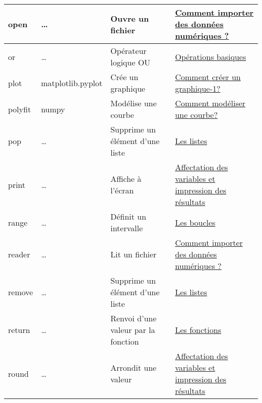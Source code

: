 \begin{longtable}{@{\extracolsep{\fill}}|p{} | p{} |p{} | p{}|@{}}
open
 & 
\ldots{}
 & 
Ouvre un fichier
 & 
\href{https://pyspc.readthedocs.io/fr/latest/05-bases/09-fichiers-csv.html}{Comment
importer des données numériques ?}
\\ \hline

or
 & 
\ldots{}
 & 
Opérateur logique OU
 & 
\href{https://pyspc.readthedocs.io/fr/latest/05-bases/04-operations_basiques.html}{Opérations
basiques}
\\ \hline

plot
 & 
matplotlib.pyplot
 & 
Crée un graphique
 & 
\href{https://pyspc.readthedocs.io/fr/latest/05-bases/10-graphiques_partie_1.html}{Comment
créer un graphique-1?}
\\ \hline

polyfit
 & 
numpy
 & 
Modélise une courbe
 & 
\href{https://pyspc.readthedocs.io/fr/latest/05-bases/11-modelisation.html}{Comment
modéliser une courbe?}
\\ \hline

pop
 & 
\ldots{}
 & 
Supprime un élément d'une liste
 & 
\href{https://pyspc.readthedocs.io/fr/latest/05-bases/08-listes.html}{Les
listes}
\\ \hline

print
 & 
\ldots{}
 & 
Affiche à l'écran
 & 
\href{https://pyspc.readthedocs.io/fr/latest/05-bases/02-variables_input_print.html}{Affectation
des variables et impression des résultats}
\\ \hline

range
 & 
\ldots{}
 & 
Définit un intervalle
 & 
\href{https://pyspc.readthedocs.io/fr/latest/05-bases/06-boucles.html}{Les
boucles}
\\ \hline

reader
 & 
\ldots{}
 & 
Lit un fichier
 & 
\href{https://pyspc.readthedocs.io/fr/latest/05-bases/09-fichiers-csv.html}{Comment
importer des données numériques ?}
\\ \hline

remove
 & 
\ldots{}
 & 
Supprime un élément d'une liste
 & 
\href{https://pyspc.readthedocs.io/fr/latest/05-bases/08-listes.html}{Les
listes}
\\ \hline

return
 & 
\ldots{}
 & 
Renvoi d'une valeur par la fonction
 & 
\href{https://pyspc.readthedocs.io/fr/latest/05-bases/05-bases/03-fonctions.html}{Les
fonctions}
\\ \hline

round
 & 
\ldots{}
 & 
Arrondit une valeur
 & 
\href{https://pyspc.readthedocs.io/fr/latest/05-bases/02-variables_input_print.html}{Affectation
des variables et impression des résultats}
\\ \hline


\end{longtable}
